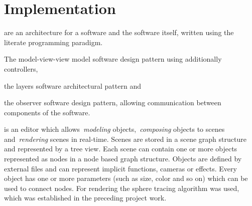 
\section{Implementation}

 are an architecture for a software and
the software itself, written using the literate programming paradigm.
\begin{enumerate*}
  \item The model-view-view model software design pattern using additionally
    controllers,
  \item the layers software architectural pattern and
  \item the observer software design pattern, allowing communication between
    components of the software.
\end{enumerate*}
 is an editor which allows~\emph{modeling}
objects,~\emph{composing} objects to scenes and~\emph{rendering} scenes in
real-time. Scenes are stored in a scene graph structure and represented by a
tree view. Each scene can contain one or more objects represented as nodes in a
node based graph structure. Objects are defined by external files and can
represent implicit functions, cameras or effects. Every object has one or more
parameters (such as size, color and so on) which can be used to connect nodes.
For rendering the sphere tracing algorithm was used, which was established in
the preceding project work.




